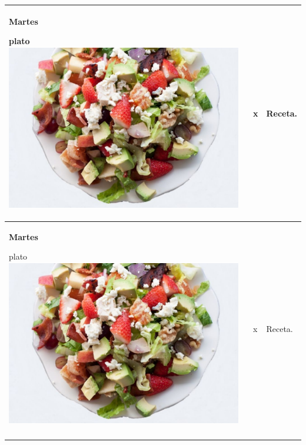 \documentclass[menu.tex]{subfiles}
\begin{document}
\begin{tabular} {p{3.5cm} p{4cm} p{9cm}}
    \pbox{20cm}
    {
        \rule{0pt}{3ex}\begin{large}\textbf{Martes}\end{large}\\ 
        \rule{0pt}{2ex}plato\\
        \includegraphics[scale=0.30]{ensalada-vegetal-con-carne} 
    } & 
    \vspace{-1.75cm}            
    \begin{compactitem} 
        \begin{scriptsize}
            \item x
        \end{scriptsize}
    \end{compactitem}&
    \vspace{-1.7cm}
    Receta.\\
    \hline

    \pbox{20cm}
    {
        \rule{0pt}{3ex}\begin{large}\textbf{Martes}\end{large}\\ 
        \rule{0pt}{2ex}plato\\
        \includegraphics[scale=0.30]{ensalada-vegetal-con-carne} 
    } & 
    \vspace{-1.75cm}            
    \begin{compactitem} 
        \begin{scriptsize}
            \item x
        \end{scriptsize}
    \end{compactitem}&
    \vspace{-1.7cm}
    Receta.\\
    \hline
\newpage
\end{tabular}
\end{document}
